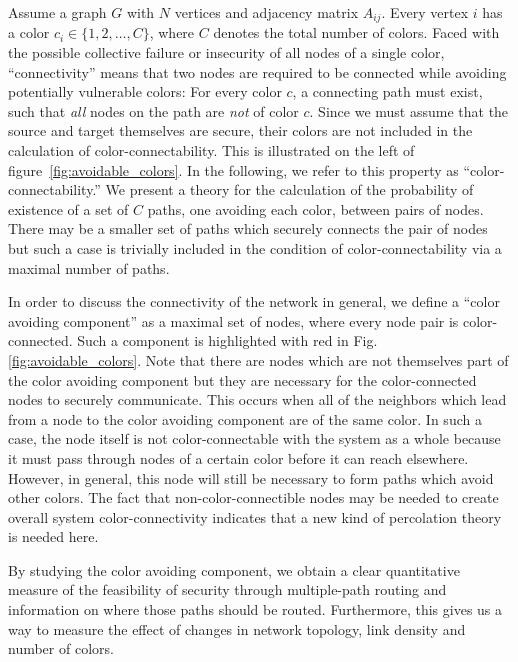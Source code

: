 \documentclass[aps, pre, twocolumn, a4paper, superscriptaddress, floatfix]{revtex4}
\begin{document}
%
Assume a graph $G$ with $N$ vertices and adjacency matrix $A_{ij}$. 
Every vertex $i$ has a color $c_i\in\{1,2,\dots,C\}$, where $C$ denotes the total number of colors. 
Faced with the possible collective failure or insecurity of all nodes of a single color, 
``connectivity'' means that two nodes are required to be connected while avoiding potentially vulnerable colors: 
For every color $c$, a connecting path must exist, such that \textit{all} nodes 
on the path are \textit{not} of color $c$.
Since we must assume that the source and target themselves are secure, their colors are not included in the calculation of color-connectability.
This is illustrated on the left of figure~\ref{fig:avoidable_colors}. 
In the following, we refer to this property as ``color-connectability.''
We present a theory for the calculation of the probability of existence of a set of $C$ paths, one avoiding each color, between pairs of nodes.
There may be a smaller set of paths which securely connects the pair of nodes but such a case is trivially included in the condition of color-connectability via a maximal number of paths.

In order to discuss the connectivity of the network in general, 
we define a ``color avoiding component'' as a maximal set of nodes, 
where every node pair is color-connected. 
Such a component is highlighted with red in Fig. \ref{fig:avoidable_colors}. 
Note that there are nodes which are not themselves part of the color avoiding component 
but they are necessary for the color-connected nodes to securely communicate.
This occurs when all of the neighbors which lead from a node to the color avoiding component are of the same color.
In such a case, the node itself is not color-connectable with the system as a whole because it must pass through nodes of a certain color before it can reach elsewhere.  
However, in general, this node will still be necessary to form paths which avoid other colors.
The fact that non-color-connectible nodes may be needed to create overall system color-connectivity indicates that a new kind of percolation theory is needed here.

By studying the color avoiding component, we obtain a clear quantitative measure of the feasibility of security through multiple-path routing and information on where those paths should be routed.
Furthermore, this gives us a way to measure the effect of changes in network topology, link density and number of colors.

\end{document}
